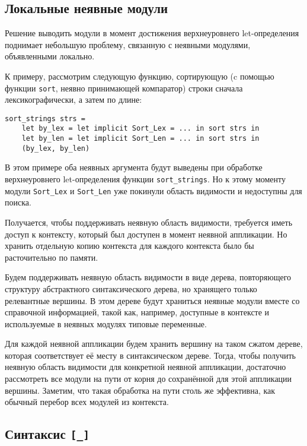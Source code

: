 \documentclass[../diploma.tex]{subfiles}
\begin{document}
\subsection{Локальные неявные модули}

Решение выводить модули в момент достижения верхнеуровнего let-определения поднимает небольшую проблему, связанную с неявными модулями, объявленными локально.

К примеру, рассмотрим следующую функцию, сортирующую (c помощью функции \texttt{sort}, неявно принимающей компаратор) строки сначала лексикографически, а затем по длине:

\begin{verbatim}
sort_strings strs = 
    let by_lex = let implicit Sort_Lex = ... in sort strs in
    let by_len = let implicit Sort_Len = ... in sort strs in
    (by_lex, by_len)
\end{verbatim}

В этом примере оба неявных аргумента будут выведены при обработке верхнеуровнего let-определения функции \texttt{sort_strings}. Но к этому моменту модули \texttt{Sort_Lex} и \texttt{Sort_Len} уже покинули область видимости и недоступны для поиска.

Получается, чтобы поддерживать неявную область видимости, требуется иметь доступ к контексту, который был доступен в момент неявной аппликации. Но хранить отдельную копию контекста для каждого контекста было бы расточительно по памяти. 

Будем поддерживать неявную область видимости в виде дерева, повторяющего структуру абстрактного синтаксического дерева, но хранящего только релевантные вершины. В этом дереве будут храниться неявные модули вместе со справочной информацией, такой как, например, доступные в контексте и используемые в неявных модулях типовые переменные. 

Для каждой неявной аппликации будем хранить вершину на таком сжатом дереве, которая соответствует её месту в синтаксическом дереве. Тогда, чтобы получить неявную область видимости для конкретной неявной аппликации, достаточно рассмотреть все модули на пути от корня до сохранённой для этой аппликации вершины. Заметим, что такая обработка на пути столь же эффективна, как обычный перебор всех модулей из контекста. 

\subsection{Синтаксис \texttt{[_]}}\label{underscore}
\end{document}
